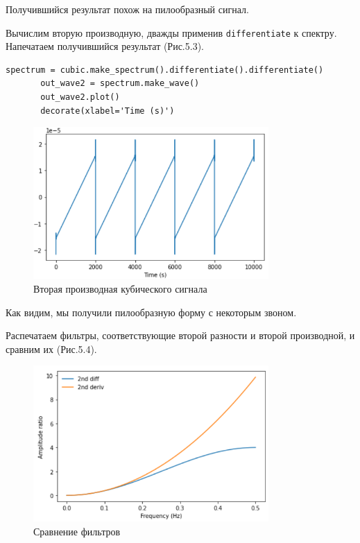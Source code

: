 \documentclass[a4paper,12pt]{report}
\begin{document}
    Получившийся результат похож на пилообразный сигнал.
    
    Вычислим вторую производную, дважды применив \texttt{differentiate} к спектру. Напечатаем получившийся результат (Рис.5.3).
\begin{lstlisting}[caption=Вычисление второй производной]
       spectrum = cubic.make_spectrum().differentiate().differentiate()
       out_wave2 = spectrum.make_wave()
       out_wave2.plot()
       decorate(xlabel='Time (s)')
\end{lstlisting}
\begin{figure}[H]
        \centering
        \includegraphics[width=0.8\textwidth]{fig5-3.PNG}
        \caption{Вторая производная кубического сигнала}
        \label{fig:fig5-3}
\end{figure} 

    Как видим, мы получили пилообразную форму с некоторым звоном.    
    
    Распечатаем фильтры, соответствующие второй разности и второй производной, и сравним их (Рис.5.4).
\begin{figure}[H]
        \centering
        \includegraphics[width=0.8\textwidth]{fig5-4.PNG}
        \caption{Сравнение фильтров}
        \label{fig:fig5-4}
\end{figure} 
\end{document}
